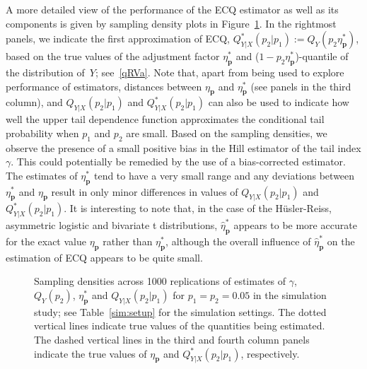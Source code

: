 \documentclass[11pt,letterpaper]{article}
\def\g{\gamma}
\def\h{\eta}
\def\pb{{\mathbf p}}
\numberwithin{equation}{section}
\begin{document}
A more detailed view of the performance of the ECQ estimator as well as its components is given by sampling density plots in Figure~\ref{sim:plot}. In the rightmost panels, we indicate the first approximation of ECQ, $Q^*_{Y|X}(p_2|p_1):=Q_Y(p_2\h_\pb^*)$, based on the true values of the adjustment factor $\h_\pb^*$ and ($1-p_2\h_\pb^*$)-quantile of the distribution of~$Y$; see~\eqref{qRVa}. Note that,  apart from being used to explore performance of estimators, distances between $\eta_\pb$ and $\eta_\pb^*$ (see panels in the third column), and $Q_{Y|X}(p_2|p_1)$ and $Q^*_{Y|X}(p_2|p_1)$ can also be used to indicate how well the upper tail dependence function approximates the conditional tail probability when $p_1$ and $p_2$ are small. Based on the sampling densities, we observe the presence of a small positive bias in the Hill estimator of the tail index $\g$. This could potentially be remedied by the use of a bias-corrected estimator. 
The estimates of $\h_\pb^*$ tend to have a very small range and any deviations between $\h_\pb^*$ and $\h_\pb$ result in only minor differences in values of $Q_{Y|X}(p_2|p_1)$ and $Q^*_{Y|X}(p_2|p_1)$. It is interesting to note that, in the case of the H\"{u}sler-Reiss, asymmetric logistic and bivariate t distributions, $\hat\h_\pb^*$ appears to be more accurate for the exact value $\h_\pb$ rather than $\h_\pb^*$, although the overall influence of $\hat\h_\pb^*$ on the estimation of ECQ appears to be quite small. 


\begin{figure}[h]
  \centering 
    \end{figure}
    \begin{figure}[H]
    \end{figure}
    \begin{figure}[H]
    \end{figure}
    \begin{figure}[H]
  \caption{Sampling densities across 1000 replications of estimates of $\gamma$,  $Q_Y(p_2)$, $\eta_\pb^*$ and $Q_{Y|X}(p_2|p_1)$ for $p_1=p_2=0.05$ in the simulation study; see Table~\ref{sim:setup} for the simulation settings. The dotted vertical lines indicate true values of the quantities being estimated. The dashed vertical lines in the third and fourth column panels indicate the true values of $\eta_\pb$ and $Q_{Y|X}^*(p_2|p_1)$, respectively.}
  \label{sim:plot}
\end{figure}
\end{document}
